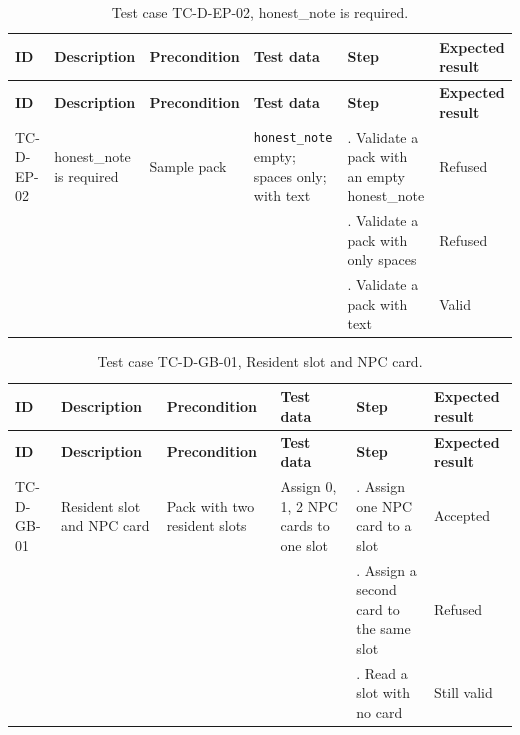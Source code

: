 {\footnotesize{}\renewcommand{\arraystretch}{1.1}
\begin{longtable}{|>{\raggedright\arraybackslash}p{}|>{\raggedright\arraybackslash}p{}|>{\raggedright\arraybackslash}p{}|>{\raggedright\arraybackslash}p{}|>{\raggedright\arraybackslash}p{}|>{\raggedright\arraybackslash}p{}|}
\caption{Test case TC-D-EP-02, honest\_note is required.} \\
\hline
\textbf{ID} & \textbf{Description} & \textbf{Precondition} & \textbf{Test data} & \textbf{Step} & \textbf{Expected result} \\ \hline
\endfirsthead
\hline
\textbf{ID} & \textbf{Description} & \textbf{Precondition} & \textbf{Test data} & \textbf{Step} & \textbf{Expected result} \\ \hline
\endhead
TC-D-EP-02 & honest\_note is required & Sample pack & \texttt{honest\_\allowbreak{}note} empty; spaces only; with text & 1. Validate a pack with an empty honest\_note & Refused \\ \cline{5-6}
 &  &  &  & 2. Validate a pack with only spaces & Refused \\ \cline{5-6}
 &  &  &  & 3. Validate a pack with text & Valid \\ \hline
\end{longtable}
}

{\footnotesize{}\renewcommand{\arraystretch}{1.1}
\begin{longtable}{|>{\raggedright\arraybackslash}p{}|>{\raggedright\arraybackslash}p{}|>{\raggedright\arraybackslash}p{}|>{\raggedright\arraybackslash}p{}|>{\raggedright\arraybackslash}p{}|>{\raggedright\arraybackslash}p{}|}
\caption{Test case TC-D-GB-01, Resident slot and NPC card.} \\
\hline
\textbf{ID} & \textbf{Description} & \textbf{Precondition} & \textbf{Test data} & \textbf{Step} & \textbf{Expected result} \\ \hline
\endfirsthead
\hline
\textbf{ID} & \textbf{Description} & \textbf{Precondition} & \textbf{Test data} & \textbf{Step} & \textbf{Expected result} \\ \hline
\endhead
TC-D-GB-01 & Resident slot and NPC card & Pack with two resident slots & Assign 0, 1, 2 NPC cards to one slot & 1. Assign one NPC card to a slot & Accepted \\ \cline{5-6}
 &  &  &  & 2. Assign a second card to the same slot & Refused \\ \cline{5-6}
 &  &  &  & 3. Read a slot with no card & Still valid \\ \hline
\end{longtable}
}

